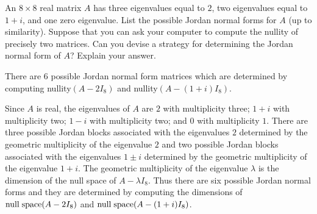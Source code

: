 \documentclass{ximera}
\begin{document}
\begin{exercise}  \label{c10.5.2C}
An $8\times 8$ real matrix $A$ has three eigenvalues equal to $2$, two 
eigenvalues equal to $1+i$, and one zero eigenvalue.  List the possible 
Jordan normal forms for $A$ (up to similarity).  Suppose that you can ask 
your computer to compute the nullity of precisely two matrices.  Can you 
devise a strategy for determining the Jordan normal form of $A$?  Explain 
your answer.

\begin{solution}
\ans There are $6$ possible Jordan normal form matrices which are
determined by computing nullity$(A-2I_8)$ and nullity$(A-(1+i)I_8)$.

\soln  Since $A$ is real, the eigenvalues of $A$ are $2$ with multiplicity three; 
$1+i$ with multiplicity two; $1-i$ with multiplicity two; and $0$ with multiplicity 
$1$.  There are three possible Jordan blocks associated with the eigenvalues $2$
determined by the geometric multiplicity of the eigenvalue $2$ and two possible Jordan
blocks associated with the eigenvalues $1\pm i$ determined by the geometric
multiplicity of the eigenvalue $1+i$.  The geometric multiplicity of the
eigenvalue $\lambda$ is the dimension of the null space of $A-\lambda I_8$.  Thus 
there are six possible Jordan normal forms and they are determined by computing the
dimensions of ${\rm null\;space}(A-2I_8)$ and ${\rm null\;space}(A-(1+i)I_8)$.


\end{solution}
\end{exercise}
\end{document}
